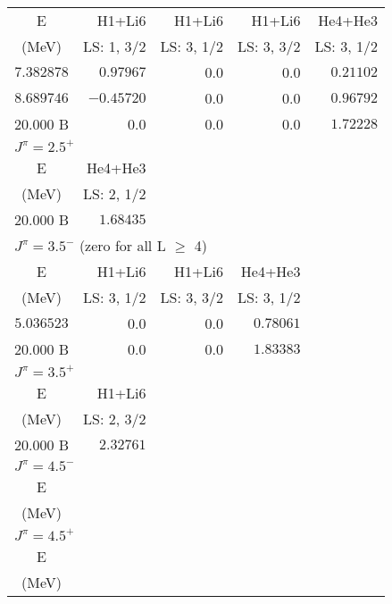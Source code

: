 \documentclass[aps]{revtex4}
\begin{document}
\begin{longtable}{c|rrrr}
E& H1+Li6 & H1+Li6 & H1+Li6 & He4+He3 \\[1pt]
(MeV)& LS: 1, 3/2 & LS: 3, 1/2 & LS: 3, 3/2 & LS: 3, 1/2 \\[1pt]
$7.382878$ & $0.97967$ & 0.0 & 0.0 & $0.21102$ \rule{0pt}{8pt}\\[1pt]
$8.689746$ & $-0.45720$ & 0.0 & 0.0 & $0.96792$ \rule{0pt}{8pt}\\[1pt]
20.000 B & 0.0 & 0.0 & 0.0 & $1.72228$ \rule{0pt}{8pt}\\[1pt]
\hline\multicolumn{5}{l}{ $J^\pi = 2.5^+$  \rule{0pt}{7pt}}\\[1pt]\hline
E& He4+He3 \\[1pt]
(MeV)& LS: 2, 1/2 \\[1pt]
20.000 B & $1.68435$ \rule{0pt}{8pt}\\[1pt]
\hline\multicolumn{5}{l}{ $J^\pi = 3.5^-$  (zero for all L $\geq$ 4) \rule{0pt}{7pt}}\\[1pt]\hline
E& H1+Li6 & H1+Li6 & He4+He3 \\[1pt]
(MeV)& LS: 3, 1/2 & LS: 3, 3/2 & LS: 3, 1/2 \\[1pt]
$5.036523$ & 0.0 & 0.0 & $0.78061$ \rule{0pt}{8pt}\\[1pt]
20.000 B & 0.0 & 0.0 & $1.83383$ \rule{0pt}{8pt}\\[1pt]
\hline\multicolumn{5}{l}{ $J^\pi = 3.5^+$  \rule{0pt}{7pt}}\\[1pt]\hline
E& H1+Li6 \\[1pt]
(MeV)& LS: 2, 3/2 \\[1pt]
20.000 B & $2.32761$ \rule{0pt}{8pt}\\[1pt]
\hline\multicolumn{5}{l}{ $J^\pi = 4.5^-$  \rule{0pt}{7pt}}\\[1pt]\hline
E\\[1pt]
(MeV)\\[1pt]
\hline\multicolumn{5}{l}{ $J^\pi = 4.5^+$  \rule{0pt}{7pt}}\\[1pt]\hline
E\\[1pt]
(MeV)\\[1pt]
\end{longtable}
\end{document}

